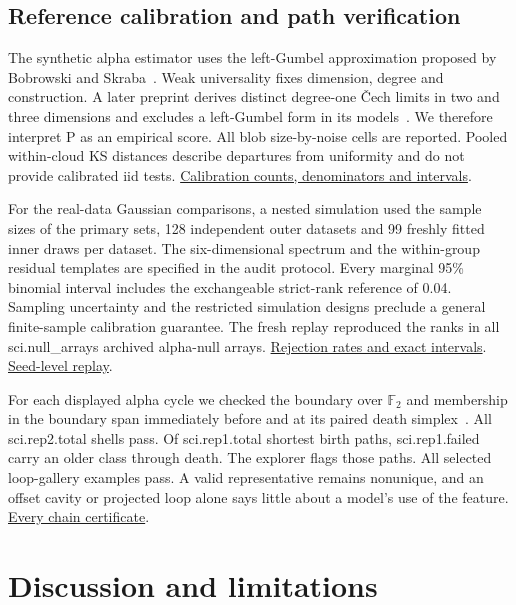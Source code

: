 \documentclass[10pt]{article}
\newcommand{\evidence}[2]{\href{https://github.com/BurnyCoder/topology-of-neural-geometry-in-llm-mechanistic-interpretability/blob/main/#1}{#2}}
\begin{document}
\subsection{Reference calibration and path verification}

The synthetic alpha estimator uses the left-Gumbel approximation proposed by Bobrowski and Skraba~\citep{bobrowski2023universal}. Weak universality fixes dimension, degree and construction. A later preprint derives distinct degree-one \v{C}ech limits in two and three dimensions and excludes a left-Gumbel form in its models~\citep{weak2024,strong2026}. We therefore interpret P as an empirical score. All blob size-by-noise cells are reported. Pooled within-cloud KS distances describe departures from uniformity and do not provide calibrated iid tests. \evidence{results/science/blobs.csv}{Calibration counts, denominators and intervals}.

For the real-data Gaussian comparisons, a nested simulation used the sample sizes of the primary sets, 128 independent outer datasets and 99 freshly fitted inner draws per dataset. The six-dimensional spectrum and the within-group residual templates are specified in the audit protocol. Every marginal 95\% binomial interval includes the exchangeable strict-rank reference of 0.04. Sampling uncertainty and the restricted simulation designs preclude a general finite-sample calibration guarantee. The fresh replay reproduced the ranks in all {{sci.null_arrays}} archived alpha-null arrays. \evidence{results/science/calibration.csv}{Rejection rates and exact intervals}. \evidence{results/science/null_replay.csv}{Seed-level replay}.

For each displayed alpha cycle we checked the boundary over $\mathbb F_2$ and membership in the boundary span immediately before and at its paired death simplex~\citep{edelsbrunner2010computational}. All {{sci.rep2.total}} shells pass. Of {{sci.rep1.total}} shortest birth paths, {{sci.rep1.failed}} carry an older class through death. The explorer flags those paths. All selected loop-gallery examples pass. A valid representative remains nonunique, and an offset cavity or projected loop alone says little about a model's use of the feature. \evidence{results/science/representatives.csv.gz}{Every chain certificate}.

\section{Discussion and limitations}
\end{document}
